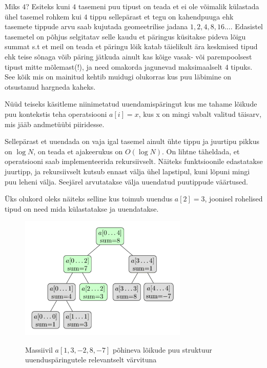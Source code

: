 \documentclass{trkut}
\begin{document}
Miks $4$? Esiteks kuni $4$ tasemeni puu tipust on teada et ei ole võimalik külastada ühel tasemel rohkem kui $4$ tippu sellepärast et tegu on kahendpuuga ehk tasemete tippude arvu saab kujutada geomeetrilise jadana ${1, 2, 4, 8, 16...}$. Edasistel tasemetel on põhjus selgitatav selle kaudu et päringus küsitakse pideva lõigu summat s.t et meil on teada et päringu lõik katab täielikult ära keskmised tipud ehk teise sõnaga võib päring jätkuda ainult kas kõige vasak- või parempoolsest tipust mitte mõlemast(!), ja need omakorda jagunevad maksimaalselt $4$ tipuks. See kõik mis on mainitud kehtib muidugi olukorras kus puu läbimine on otsustanud hargneda kaheks. \parencite{EMaxx}

Nüüd teiseks käsitleme niinimetatud uuendamispäringut kus me tahame lõikude puu kontekstis teha operatsiooni $a[i]=x$, kus x on mingi vabalt valitud täisarv, mis jääb andmetüübi piiridesse. \parencite{EMaxx}

Sellepärast et uuendada on vaja igal tasemel ainult ühte tippu ja juurtipu pikkus on $\log N$, on teada et ajakeerukus on $O(\log N)$.
On lihtne täheldada, et operatsiooni saab implementeerida rekursiivselt. Näiteks funktsioonile edastatakse juurtipp, ja rekursiivselt kutsub ennast välja ühel lapstipul, kuni lõpuni mingi puu leheni välja. Seejärel arvutatakse välja uuendatud puutippude väärtused. \parencite{EMaxx}


Üks olukord oleks näiteks selline kus toimub uuendus $a[2]=3$, joonisel rohelised tipud on need mida külastatakse ja uuendatakse.

\begin{figure}[H]%
    \includegraphics[width=8cm]{ULPUU.png}%
    \caption{Massiivil $a[1,3,-2,8,-7]$ põhineva lõikude puu struktuur uuenduspäringutele relevantselt värvituna}%
    \label{EMaxx}%
\end{figure}
\end{document}
